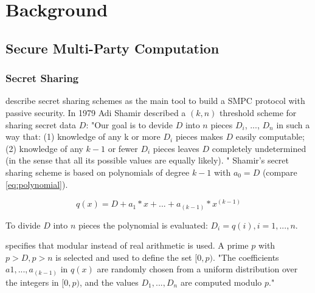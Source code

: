 \chapter{Background }
	
	\section{Secure Multi-Party Computation}

		
		
		
		

		\subsection*{Secret Sharing}
		
		\textcite[p. ]{Cra:1} describe secret sharing schemes as the main tool to build a \gls{SMPC} protocol with passive security. In 1979 Adi Shamir described a $(k, n)$ threshold scheme for sharing secret data $D$: "Our goal is to devide $D$ into $n$ pieces $D_i$, ..., $D_n$ in such a way that:
		(1) knowledge of any k or more $D_i$ pieces makes $D$ easily computable; (2) knowledge of any $k-1$ or fewer $D_i$ pieces leaves $D$ completely undetermined (in the sense that all its possible values are equally likely). " \autocite{Sha:1}
		Shamir's secret sharing scheme is based on polynomials of degree $k-1$ with $a_0=D$ (compare \ref{eq:polynomial}). 
		
		\begin{equation}
		\label{eq:polynomial}
		q(x)=D + a_1*x + ... + a_(k-1)*x^(k-1)
		\end{equation}
		
		To divide $D$ into $n$ pieces the polynomial is evaluated: $D_i=q(i), i=1,...,n$.
		
		\textcite{Sha:1} specifies that modular instead of real arithmetic is used. A prime $p$ with $p>D, p>n$ is selected and used to define the set $[0, p)$. "The coefficients $a1, ..., a_(k-1)$ in $q(x)$ are randomly chosen	from a uniform distribution over the integers in $[0, p)$, and the values $D_1, ..., D_n$ are computed modulo $p$." \autocite[p. 613]{Sha:1}
		
